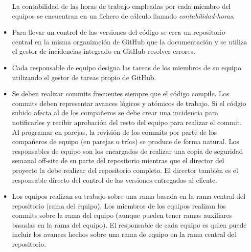 \begin{itemize}
		La contabilidad de las horas de trabajo empleadas por cada miembro del equipos se encuentran en un fichero de cálculo llamado \textit{contabilidad-horas}.
 \item{ Para llevar un control de las versiones del código se crea un repositorio central en la misma organización de GitHub que la documentación y se utiliza el gestor de incidencias integrado en GitHub resolver errores.}
\item{Cada responsable de equipo designa las tareas de los miembros de su equipo utilizando el gestor de tareas propio de GitHub. }
    \item{Se deben realizar commits frecuentes siempre que el código compile. Los commits deben representar avances lógicos y atómicos de trabajo.  Si el códgio subido afecta al de los compañeros se debe crear una incidencia para notificarles  y recibir aprobación del resto del equipo para realizar el commit. Al programar en parejas, la revisión de los commits por parte de los compañeros de equipo (en parejas o tríos) se produce de forma natural. Los responsables de equipo son los encargados de realizar una copia de seguridad semanal off-site de su parte del repositorio mientras que el director del proyecto la debe realizar del repositorio completo. El director también es el responsable directo del control de las versiones entregadas al cliente. }
		\item Los equipos realizan su trabajo sobre una rama basada en la rama central del repositorio (rama del equipo). Los miembros de los equipos realizan los commits sobre la rama del equipo (aunque pueden tener ramas auxiliares basadas en la rama del equipo). El responsable de cada equipo es quien puede incluir los avances hechos sobre una rama de equipo en la rama central del repositorio.

\end{itemize}

